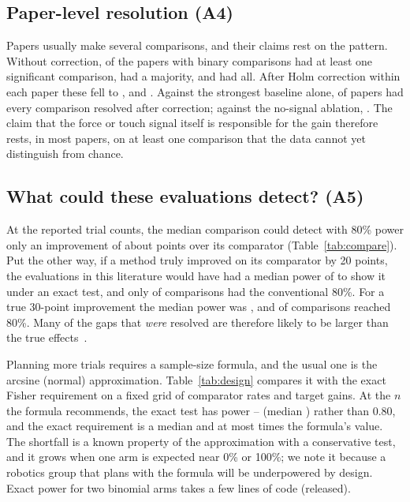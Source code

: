 \documentclass[11pt]{article}
\begin{document}
\subsection{Paper-level resolution (A4)}
Papers usually make several comparisons, and their claims rest on the pattern. Without correction, \AuditPapersUnadjAtLeastOne{} of the \AuditPapersWithComparisons{} papers with binary comparisons had at least one significant comparison, \AuditPapersUnadjMajority{} had a majority, and \AuditPapersUnadjAll{} had all. After Holm correction within each paper these fell to \AuditPapersHolmAtLeastOne{}, \AuditPapersHolmMajority{} and \AuditPapersHolmAll{}. Against the strongest baseline alone, \AuditPapersBHolmAll{} of papers had every comparison resolved after correction; against the no-signal ablation, \AuditPapersAHolmAll{}. The claim that the force or touch signal itself is responsible for the gain therefore rests, in most papers, on at least one comparison that the data cannot yet distinguish from chance.

\subsection{What could these evaluations detect? (A5)}\label{sec:power}
At the reported trial counts, the median comparison could detect with 80\% power only an improvement of about \AuditMedianMDD{} points over its comparator (Table~\ref{tab:compare}). Put the other way, if a method truly improved on its comparator by 20 points, the evaluations in this literature would have had a median power of \AuditMedPowTwenty{} to show it under an exact test, and only \AuditSharePowTwenty{} of comparisons had the conventional 80\%. For a true 30-point improvement the median power was \AuditMedPowThirty{}, and \AuditSharePowThirty{} of comparisons reached 80\%. Many of the gaps that \emph{were} resolved are therefore likely to be larger than the true effects~\cite{button2013,gelman2014}.

Planning more trials requires a sample-size formula, and the usual one is the arcsine (normal) approximation. Table~\ref{tab:design} compares it with the exact Fisher requirement on a fixed grid of comparator rates and target gains. At the $n$ the formula recommends, the exact test has power \AuditDesignPowMin--\AuditDesignPowMax{} (median \AuditDesignPowMedian) rather than 0.80, and the exact requirement is a median \AuditDesignExactOverArcsineMedian{} and at most \AuditDesignExactOverArcsineMax{} times the formula's value. The shortfall is a known property of the approximation with a conservative test, and it grows when one arm is expected near 0\% or 100\%; we note it because a robotics group that plans with the formula will be underpowered by design. Exact power for two binomial arms takes a few lines of code (released).
\end{document}

